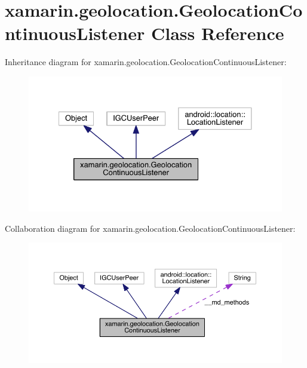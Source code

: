 \hypertarget{classxamarin_1_1geolocation_1_1_geolocation_continuous_listener}{\section{xamarin.\+geolocation.\+Geolocation\+Continuous\+Listener Class Reference}
\label{classxamarin_1_1geolocation_1_1_geolocation_continuous_listener}
}


Inheritance diagram for xamarin.\+geolocation.\+Geolocation\+Continuous\+Listener\+:
\nopagebreak
\begin{figure}[H]
\begin{center}
\leavevmode
\includegraphics[width=330pt]{classxamarin_1_1geolocation_1_1_geolocation_continuous_listener__inherit__graph}
\end{center}
\end{figure}


Collaboration diagram for xamarin.\+geolocation.\+Geolocation\+Continuous\+Listener\+:
\nopagebreak
\begin{figure}[H]
\begin{center}
\leavevmode
\includegraphics[width=350pt]{classxamarin_1_1geolocation_1_1_geolocation_continuous_listener__coll__graph}
\end{center}
\end{figure}
